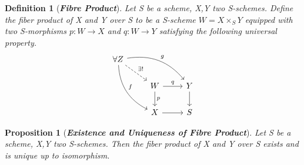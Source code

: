 \documentclass{ctexart}
\newtheorem{definition}{Definition}[section]
\newtheorem{proposition}{Proposition}[section]
\begin{document}
\begin{definition}[\textbf{\emph{Fibre Product}}]
    Let S be a scheme, X,Y two S-schemes.
    Define the fiber product of X and Y over S to be a S-scheme $W = X \times_{S} Y$ equipped with two S-morphisms $p: W \longrightarrow X$ and $q: W \longrightarrow Y$ satisfying the following universal property.
    \begin{equation*}
        \begin{tikzcd}
            \forall Z \arrow[drr, "g", bend left] \arrow[dr, "\exists!" ,dashrightarrow] \arrow[ddr, "f", bend right] && \\
            & W \arrow[r, "q"] \arrow[d, "p"] &
            Y \arrow[d] \\
            & X \arrow[r] &
            S
        \end{tikzcd}
    \end{equation*}
\end{definition}
\begin{proposition}[\textbf{\emph{Existence and Uniqueness of Fibre Product}}]
    Let S be a scheme, X,Y two S-schemes.
    Then the fiber product of X and Y over S exists and is unique up to isomorphism.
    \label{Proposition 2.7}
\end{proposition}
\end{document}
